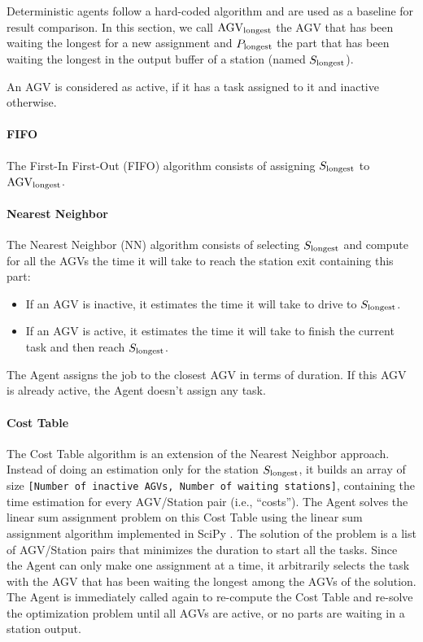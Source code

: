 \documentclass[sn-mathphys]{sn-jnl}
\begin{document}
Deterministic agents follow a hard-coded algorithm and are used as a baseline for result comparison. In this section, we call $\text{AGV}_{\rm longest}$ the AGV that has been waiting the longest for a new assignment and $P_{\rm longest}$ the part that has been waiting the longest in the output buffer of a station (named $S_{\rm longest}$).

An AGV is considered as active, if it has a task assigned to it and inactive otherwise.

\paragraph{FIFO}

The First-In First-Out (FIFO) algorithm consists of assigning $S_{\rm longest}$ to $\text{AGV}_{\rm longest}$.

\paragraph{Nearest Neighbor}

The Nearest Neighbor (NN) algorithm consists of selecting $S_{\rm longest}$ and compute for all the AGVs the time it will take to reach the station exit containing this part:
\begin{itemize}
    \item If an AGV is inactive, it estimates the time it will take to drive to $S_{\rm longest}$.
    \item If an AGV is active, it estimates the time it will take to finish the current task and then reach $S_{\rm longest}$.
\end{itemize}

The Agent assigns the job to the closest AGV in terms of duration. If this AGV is already active, the Agent doesn’t assign any task.

\paragraph{Cost Table}

The Cost Table algorithm is an extension of the Nearest Neighbor approach. Instead of doing an estimation only for the station $S_{\rm longest}$, it builds an array of size \texttt{[Number of inactive AGVs, Number of waiting stations]}, containing the time estimation for every AGV/Station pair (i.e., “costs”). The Agent solves the linear sum assignment problem on this Cost Table using the linear sum assignment algorithm \cite{linearsumassignment} implemented in SciPy \cite{2020SciPy-NMeth}. The solution of the problem is a list of AGV/Station pairs that minimizes the duration to start all the tasks. Since the Agent can only make one assignment at a time, it arbitrarily selects the task with the AGV that has been waiting the longest among the AGVs of the solution. The Agent is immediately called again to re-compute the Cost Table and re-solve the optimization problem until all AGVs are active, or no parts are waiting in a station output.
\end{document}
